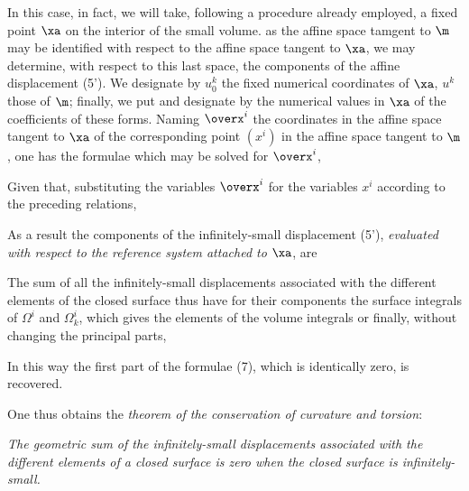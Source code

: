 In this case, in fact, we will take, following a procedure already employed, a fixed point $\xa$ on the interior of the small volume. as the affine space tamgent to $\m$ may be identified with respect to the affine space tangent to $\xa$, we may determine, with respect to this last space, the components of the affine displacement (5'). We designate by $u_0^k$ the fixed numerical coordinates of $\xa$, $u^k$ those of $\m$; finally, we put
and designate by
the numerical values in $\xa$ of the coefficients of these forms. Naming $\overx^i$ the coordinates in the affine space tangent to $\xa$ of the corresponding point $(x^i)$ in the affine space tangent to $\m$, one has the formulae
which may be solved for $\overx^i$,

Given that, substituting the variables $\overx^i$ for the variables $x^i$ according to the preceding relations,

As a result the components of the infinitely-small displacement (5'), \textit{evaluated with respect to the reference system attached to $\xa$}, are

The sum of all the infinitely-small displacements associated with the different elements of the closed surface thus have for their components the surface integrals of $\Omega^i$ and $\Omega_k^i$, which gives the elements of the volume integrals
or finally, without changing the principal parts,

In this way the first part of the formulae (7), which is identically zero, is recovered.

One thus obtains the \textit{theorem of the conservation of curvature and torsion}:

\textit{The geometric sum of the infinitely-small displacements associated with the different elements of a closed surface is zero when the closed surface is infinitely-small.}